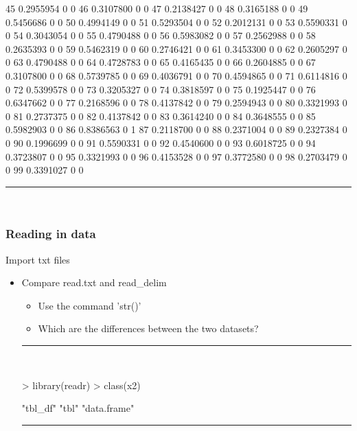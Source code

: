 \documentclass{beamer}
\begin{document}
\begin{frame}[fragile]
\begin{itemize}
\begin{Schunk}
\begin{Soutput}
45   0.2955954   0   0
46   0.3107800   0   0
47   0.2138427   0   0
48   0.3165188   0   0
49   0.5456686   0   0
50   0.4994149   0   0
51   0.5293504   0   0
52   0.2012131   0   0
53   0.5590331   0   0
54   0.3043054   0   0
55   0.4790488   0   0
56   0.5983082   0   0
57   0.2562988   0   0
58   0.2635393   0   0
59   0.5462319   0   0
60   0.2746421   0   0
61   0.3453300   0   0
62   0.2605297   0   0
63   0.4790488   0   0
64   0.4728783   0   0
65   0.4165435   0   0
66   0.2604885   0   0
67   0.3107800   0   0
68   0.5739785   0   0
69   0.4036791   0   0
70   0.4594865   0   0
71   0.6114816   0   0
72   0.5399578   0   0
73   0.3205327   0   0
74   0.3818597   0   0
75   0.1925447   0   0
76   0.6347662   0   0
77   0.2168596   0   0
78   0.4137842   0   0
79   0.2594943   0   0
80   0.3321993   0   0
81   0.2737375   0   0
82   0.4137842   0   0
83   0.3614240   0   0
84   0.3648555   0   0
85   0.5982903   0   0
86   0.8386563   0   1
87   0.2118700   0   0
88   0.2371004   0   0
89   0.2327384   0   0
90   0.1996699   0   0
91   0.5590331   0   0
92   0.4540600   0   0
93   0.6018725   0   0
94   0.3723807   0   0
95   0.3321993   0   0
96   0.4153528   0   0
97   0.3772580   0   0
98   0.2703479   0   0
99   0.3391027   0   0
\end{Soutput}
\end{Schunk}
\rule{\textwidth}{0.4pt}\\
\small
	
	\end{itemize}
\end{frame}


\begin{frame}[fragile]
	\frametitle{Reading in data}
	\centering \Large Import txt files
	\begin{itemize}
		\small
		\item Compare read.txt and read\_delim
			\begin{itemize}
				\item Use the command 'str()'
				\item Which are the differences between the two datasets?
			\end{itemize}
\rule{\textwidth}{0.4pt}\\
\tiny
\setlength{\fancyvrbtopsep}{-1pt}
\setlength{\fancyvrbpartopsep}{-1pt}
\begin{Schunk}
\begin{Sinput}
> library(readr)
> class(x2)
\end{Sinput}
\begin{Soutput}
[1] "tbl_df"     "tbl"        "data.frame"
\end{Soutput}
\end{Schunk}
\rule{\textwidth}{0.4pt}\\
\small
	
	\end{itemize}
\end{frame}
\end{document}
